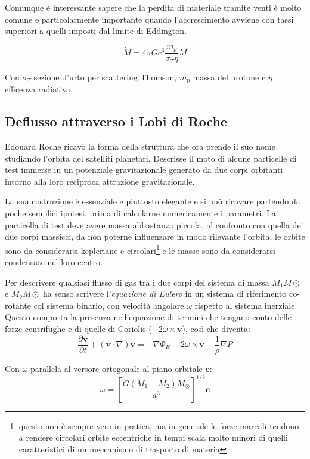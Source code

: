 \documentclass[a4paperbi]{article}
\begin{document}
	Comunque è interessante sapere che la perdita di materiale tramite venti è molto comune e particolarmente importante quando l'accrescimento avviene con tassi superiori a quelli imposti dal limite di Eddington.
	
	\begin{equation}
		\dot{M}=4\pi Gc^3\frac{m_p}{\sigma_T \eta}M
	\end{equation}
	
	Con $\sigma_T$ sezione d'urto per scattering Thomson, $m_p$ massa del protone e $\eta$ efficenza radiativa.

\subsection{Deflusso attraverso i Lobi di Roche}
	Edouard Roche ricavò la forma della struttura che ora prende il suo nome studiando l'orbita dei satelliti planetari. Descrisse il moto di alcune particelle di test immerse in un potenziale gravitazionale generato da due corpi orbitanti intorno alla loro reciproca attrazione gravitazionale.
	
	La sua costruzione è essenziale e piuttosto elegante e si può ricavare partendo da poche semplici ipotesi, prima di calcolarne numericamente i parametri. La particella di test deve avere massa abbastanza piccola, al confronto con quella dei due corpi massicci, da non poterne influenzare in modo rilevante l'orbita; le orbite sono da considerarsi kepleriane e circolari\footnote{questo non è sempre vero in pratica, ma in generale le forze mareali tendono a rendere circolari orbite eccentriche in tempi scala molto minori di quelli caratteristici di un meccanismo di trasporto di materia} e le masse sono da considerarsi condensate nel loro centro.
	
	Per descrivere qualsiasi flusso di gas tra i due corpi del sistema di massa $M_1M\odot$ e $M_2M\odot$ ha senso scrivere l'\textit{equazione di Eulero} in un sistema di riferimento co-rotante col sistema binario, con velocità angolare $\omega$ rispetto al sistema inerziale. Questo comporta la presenza nell'equazione di termini che tengano conto delle forze centrifughe e di quelle di Coriolis ($-2\omega\times\textbf{v}$), così che diventa:
	\begin{equation}
		\frac{\partial \textbf{v}}{\partial t}+(\textbf{v}\cdot\nabla)\textbf{v}=-\nabla\Phi_R-2\omega\times\textbf{v}-\frac{1}{\rho}\nabla P
	\end{equation}
	
	Con $\omega$ parallela al versore ortogonale al piano orbitale $\textbf{e}$:
	\begin{equation}
		\omega=\left[\frac{G(M_1+M_2)M_\odot}{a^3}\right]^{1/2}\textbf{e}
	\end{equation}
	
\end{document}
